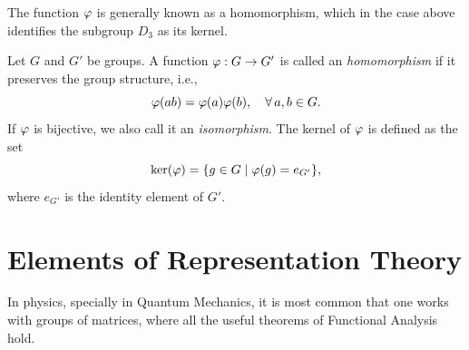 The function $\varphi$ is generally known as a homomorphism, which in the case above identifies the subgroup $D_3$ as its kernel.

\begin{definition} \label{def:homomorphism}
Let $G$ and ${G'}$ be groups. A function $\varphi: G \to {G'}$ is called an \textit{homomorphism} if it preserves the group structure, i.e.,
\begin{equation} \label{eq:homomorphism}
\varphi(a b) = \varphi(a) \varphi(b), \quad \forall \, a,b \in G.
\end{equation}
If $\varphi$ is bijective, we also call it an \textit{isomorphism}. The kernel of $\varphi$ is defined as the set
\begin{equation} \label{eq:kernel_homomorphism}
\ker(\varphi) = \qty{g \in G \mid \varphi(g) = e_{G'}},
\end{equation}
where $e_{G'}$ is the identity element of ${G'}$.
\end{definition}

\section{Elements of Representation Theory} \label{sec:representation_theory}

In physics, specially in Quantum Mechanics, it is most common that one works with groups of matrices, where all the useful theorems of Functional Analysis hold.

